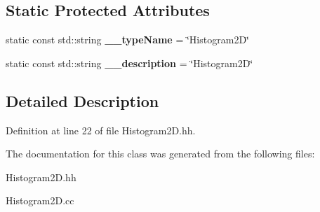 \subsection*{Static Protected Attributes}
\begin{DoxyCompactItemize}
\item 
static const std::string {\bfseries \_\-\_\-typeName} = \char`\"{}Histogram2D\char`\"{}\label{classhistmgr_1_1Histogram2D_ae180a84a85576bfe6648db62f402d42e}

\item 
static const std::string {\bfseries \_\-\_\-description} = \char`\"{}Histogram2D\char`\"{}\label{classhistmgr_1_1Histogram2D_a0d54044cca0f5111309d9a22481b6236}

\end{DoxyCompactItemize}


\subsection{Detailed Description}


Definition at line 22 of file Histogram2D.hh.

The documentation for this class was generated from the following files:\begin{DoxyCompactItemize}
\item 
Histogram2D.hh\item 
Histogram2D.cc\end{DoxyCompactItemize}
